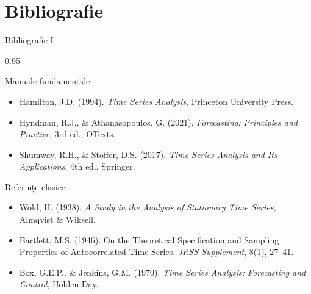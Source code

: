 \documentclass[9pt, aspectratio=169, t]{beamer}
\begin{document}
\section{Bibliografie}

\begin{frame}{Bibliografie I}
    \vspace{-0.3cm}
    \begin{cminipage}{0.95\textwidth}
        \begin{block}{Manuale fundamentale}
            {\small
            \begin{itemize}\setlength{\itemsep}{0pt}
                \item Hamilton, J.D. (1994). \textit{Time Series Analysis}, Princeton University Press.
                \item Hyndman, R.J., \& Athanasopoulos, G. (2021). \textit{Forecasting: Principles and Practice}, 3rd ed., OTexts.
                \item Shumway, R.H., \& Stoffer, D.S. (2017). \textit{Time Series Analysis and Its Applications}, 4th ed., Springer.
            \end{itemize}
            }
        \end{block}

        \begin{exampleblock}{Referințe clasice}
            {\small
            \begin{itemize}\setlength{\itemsep}{0pt}
                \item Wold, H. (1938). \textit{A Study in the Analysis of Stationary Time Series}, Almqvist \& Wiksell.
                \item Bartlett, M.S. (1946). On the Theoretical Specification and Sampling Properties of Autocorrelated Time-Series, \textit{JRSS Supplement}, 8(1), 27--41.
                \item Box, G.E.P., \& Jenkins, G.M. (1970). \textit{Time Series Analysis: Forecasting and Control}, Holden-Day.
            \end{itemize}
            }
        \end{exampleblock}
    \end{cminipage}
\end{frame}
\end{document}
